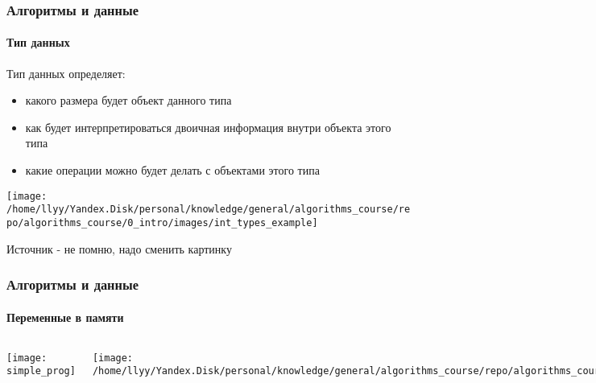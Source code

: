 \documentclass[aspectratio=169]{beamer}
\begin{document}
\begin{frame}
\frametitle{Алгоритмы и данные}
\framesubtitle{Тип данных}
\justifying
\small

Тип данных определяет:

\begin{itemize}
\item{какого размера будет объект данного типа}
\item{как будет интерпретироваться двоичная информация внутри объекта этого типа}
\item{какие операции можно будет делать с объектами этого типа}
\end{itemize}

\texttt{[image: /home/llyy/Yandex.Disk/personal/knowledge/general/algorithms\_course/repo/algorithms\_course/0\_intro/images/int\_types\_example]}
\centering

\scriptsize Источник - не помню, надо сменить картинку
\end{frame}

\begin{frame}
\frametitle{Алгоритмы и данные}
\framesubtitle{Переменные в памяти}
\justifying
\begin{block}{}
\begin{columns}[]
\column{\dimexpr\linewidth-30mm}
\justifying
\small

\centering
\texttt{[image: simple\_prog]}
\centering

\column{30mm}

\texttt{[image: /home/llyy/Yandex.Disk/personal/knowledge/general/algorithms\_course/repo/algorithms\_course/0\_intro/images/int\_types\_mem\_example]}
\centering

\end{columns}
\end{block}
\end{frame}
\end{document}
